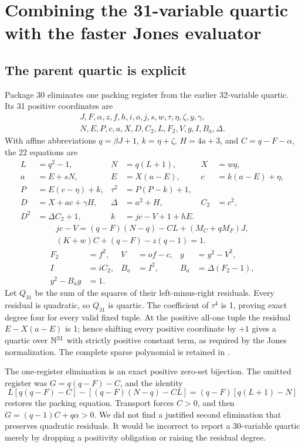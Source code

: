 \section{Combining the 31-variable quartic with the faster Jones evaluator}

\subsection{The parent quartic is explicit}

Package 30 eliminates one packing register from the earlier 32-variable
quartic. Its 31 positive coordinates are
\[
\begin{gathered}
 J,F,\alpha,z,f,h,i,o,j,s,w,\tau,\eta,\zeta,y,\gamma,\\
 N,E,P,c,a,X,D,C_2,L,F_2,V,g,I,B_a,\Delta.
\end{gathered}
\]
With affine abbreviations $q=\beta J+1$, $k=\eta+\zeta$,
$H=4a+3$, and $C=q-F-\alpha$, the 22 equations are
\begin{align*}
 L&=q^2-1,&N&=q(L+1),&X&=wq,\\
 a&=E+sN,&E&=X(a-E),&c&=k(a-E)+\eta,\\
 P&=E(c-\eta)+k,&\tau^2&=P(P-k)+1,\\
 D&=X+ac+\gamma H,&\Delta&=a^2+H,&C_2&=c^2,\\
 D^2&=\Delta C_2+1,&k&=jc-V+1+hE.
\end{align*}
\begin{gather*}
 jc-V=(q-F)(N-q)-CL+(M_C+qM_F)J,\\
 (K+w)C+(q-F)-z(q-1)=1.
\end{gather*}
\begin{align*}
 F_2&=f^2,&V&=of-c,&g&=y^2-V^2,\\
 I&=iC_2,&B_a&=I^2,&B_a&=\Delta(F_2-1),\\
 y^2-B_ag&=1.
\end{align*}
Let $Q_{31}$ be the sum of the squares of their left-minus-right residuals.
Every residual is quadratic, so $Q_{31}$ is quartic. The coefficient of
$\tau^4$ is 1, proving exact degree four for every valid fixed tuple.
At the positive all-one tuple the residual $E-X(a-E)$ is 1; hence shifting
every positive coordinate by $+1$ gives a quartic over $\mathbb N^{31}$ with
strictly positive constant term, as required by the Jones normalization.
The complete sparse polynomial is retained in
.

The one-register elimination is an exact positive zero-set bijection. The
omitted register was $G=q(q-F)-C$, and the identity
\[
 L[q(q-F)-C]-[(q-F)(N-q)-CL]=(q-F)[q(L+1)-N]
\]
restores the packing equation. Transport forces $C>0$, and then
$G=(q-1)C+q\alpha>0$. We did not find a justified second elimination that
preserves quadratic residuals. It would be incorrect to report a
30-variable quartic merely by dropping a positivity obligation or raising
the residual degree.

